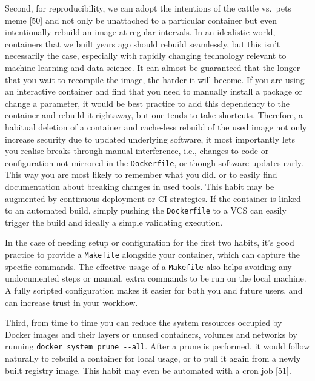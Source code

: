 \documentclass[10pt,letterpaper]{article}
\begin{document}
Second, for reproducibility, we can adopt the intentions of the cattle
vs.~pets meme {[}50{]} and not only be unattached to a particular
container but even intentionally rebuild an image at regular intervals.
In an idealistic world, containers that we built years ago should
rebuild seamlessly, but this isn't necessarily the case, especially with
rapidly changing technology relevant to machine learning and data
science. It can almost be guaranteed that the longer that you wait to
recompile the image, the harder it will become. If you are using an
interactive container and find that you need to manually install a
package or change a parameter, it would be best practice to add this
dependency to the container and rebuild it rightaway, but one tends to
take shortcuts. Therefore, a habitual deletion of a container and
cache-less rebuild of the used image not only increase security due to
updated underlying software, it most importantly lets you realise breaks
through manual interference, i.e., changes to code or configuration not
mirrored in the \texttt{Dockerfile}, or though software updates early.
This way you are most likely to remember what you did. or to easily find
documentation about breaking changes in used tools. This habit may be
augmented by continuous deployment or CI strategies. If the container is
linked to an automated build, simply pushing the \texttt{Dockerfile} to
a VCS can easily trigger the build and ideally a simple validating
execution.

In the case of needing setup or configuration for the first two habits,
it's good practice to provide a \texttt{Makefile} alongside your
container, which can capture the specific commands. The effective usage
of a \texttt{Makefile} also helps avoiding any undocumented steps or
manual, extra commands to be run on the local machine. A fully scripted
configuration makes it easier for both you and future users, and can
increase trust in your workflow.

Third, from time to time you can reduce the system resources occupied by
Docker images and their layers or unused containers, volumes and
networks by running \texttt{docker\ system\ prune\ -\/-all}. After a
prune is performed, it would follow naturally to rebuild a container for
local usage, or to pull it again from a newly built registry image. This
habit may even be automated with a cron job {[}51{]}.
\end{document}
